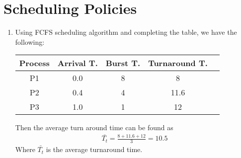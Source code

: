 \documentclass{article}
\begin{document}
\section{Scheduling Policies}%

\begin{enumerate}[label=(\alph*)]
	\item Using FCFS scheduling algorithm and completing the table, we have the
	      following:
	      \begin{center}
		      \begin{tabular}{|c|c|c|c|c|}
			      \hline
			      Process & Arrival T. & Burst T. & Turnaround T. \\
			      \hline
			      P1      & 0.0        & 8        & 8             \\
			      \hline
			      P2      & 0.4        & 4        & 11.6          \\
			      \hline
			      P3      & 1.0        & 1        & 12            \\
			      \hline
		      \end{tabular}
	      \end{center}
	      Then the average turn around time can be found as
	      \begin{align*}
		      \bar{T_{t}} = \frac{8 + 11.6 + 12}{3} = 10.5
	      \end{align*}
	      Where $\bar{T_{t}}$ is the average turnaround time.


\end{enumerate}
\end{document}
